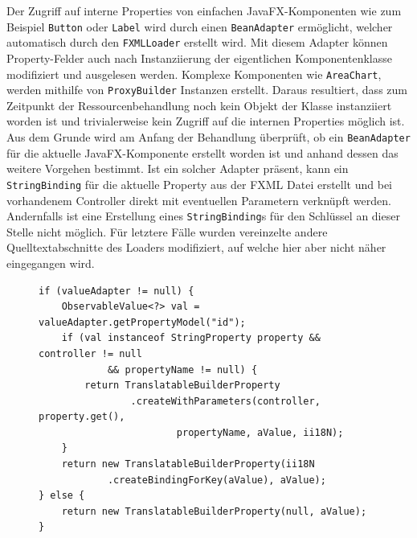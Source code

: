 \noindent Der Zugriff auf interne Properties von einfachen JavaFX-Komponenten wie zum Beispiel \texttt{Button} oder \texttt{Label} wird durch einen \texttt{BeanAdapter} ermöglicht, welcher automatisch durch den \texttt{FXMLLoader} erstellt wird. Mit diesem Adapter können Property-Felder auch nach Instanziierung der eigentlichen Komponentenklasse modifiziert und ausgelesen werden. Komplexe Komponenten wie \texttt{AreaChart}, werden mithilfe von \texttt{ProxyBuilder} Instanzen erstellt. Daraus resultiert, dass zum Zeitpunkt der Ressourcenbehandlung noch kein Objekt der Klasse instanziiert worden ist und trivialerweise kein Zugriff auf die internen Properties möglich ist. Aus dem Grunde wird am Anfang der Behandlung überprüft, ob ein \texttt{BeanAdapter} für die aktuelle JavaFX-Komponente erstellt worden ist und anhand dessen das weitere Vorgehen bestimmt. Ist ein solcher Adapter präsent, kann ein \texttt{StringBinding} für die aktuelle Property aus der FXML Datei erstellt und bei vorhandenem Controller direkt mit eventuellen Parametern verknüpft werden. Andernfalls ist eine Erstellung eines \texttt{StringBinding}s für den Schlüssel an dieser Stelle nicht möglich. Für letztere Fälle wurden vereinzelte andere Quelltextabschnitte des Loaders modifiziert, auf welche hier aber nicht näher eingegangen wird.
\begin{figure}[H]
	\centering
	\begin{lstlisting}[caption=Implementierung -- Ressourcenbehandlung im \texttt{SimpliFXMLLoader}, captionpos=b, label=lst:resource_handling]
if (valueAdapter != null) {
	ObservableValue<?> val = valueAdapter.getPropertyModel("id");
	if (val instanceof StringProperty property && controller != null 
			&& propertyName != null) {
		return TranslatableBuilderProperty
				.createWithParameters(controller, property.get(), 
						propertyName, aValue, ii18N);
	}
	return new TranslatableBuilderProperty(ii18N
			.createBindingForKey(aValue), aValue);
} else {
	return new TranslatableBuilderProperty(null, aValue);
}
	\end{lstlisting}
\end{figure}
